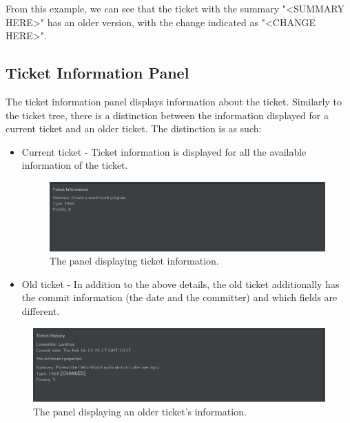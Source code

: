 \documentclass{4thYearProject}
\begin{document}
From this example, we can see that the ticket with the summary "<SUMMARY HERE>" has an older version, with the change indicated as "<CHANGE HERE>". 

\subsection{Ticket Information Panel}

The ticket information panel displays information about the ticket. Similarly to the ticket tree, there is a distinction between the information displayed for a current ticket and an older ticket. The distinction is as such:

\begin{itemize}
\item Current ticket - Ticket information is displayed for all the available information of the ticket.

\begin{figure}[H]
\includegraphics[scale=0.6]{Ticket_infopanel}
\centering
\caption{The panel displaying ticket information.}\label{ticketpanel}
\label{fig:ticketpanel}
\end{figure}

\item Old ticket - In addition to the above details, the old ticket additionally has the commit information (the date and the committer) and which fields are different.
\end{itemize}

\begin{figure}[H]
\includegraphics[scale=0.6]{OldTicket_infopanel}
\centering
\caption{The panel displaying an older ticket's information.}\label{oldticketpanel}
\label{fig:oldticketpanel}
\end{figure}
\end{document}
